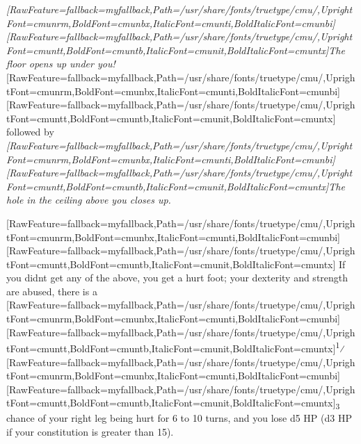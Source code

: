 \begin{myitemize}\item{}{\itshape \allowbreak{}\setmainfont{cmunti.ttf}[RawFeature={fallback=myfallback},Path=/usr/share/fonts/truetype/cmu/,UprightFont=cmunrm,BoldFont=cmunbx,ItalicFont=cmunti,BoldItalicFont=cmunbi]\setmonofont{cmunti.ttf}[RawFeature={fallback=myfallback},Path=/usr/share/fonts/truetype/cmu/,UprightFont=cmuntt,BoldFont=cmuntb,ItalicFont=cmunit,BoldItalicFont=cmuntx]\itshape {}The floor opens up under you!}{$\text{ }$}\allowbreak{}\setmainfont{cmunrm.ttf}[RawFeature={fallback=myfallback},Path=/usr/share/fonts/truetype/cmu/,UprightFont=cmunrm,BoldFont=cmunbx,ItalicFont=cmunti,BoldItalicFont=cmunbi]\setmonofont{cmunrm.ttf}[RawFeature={fallback=myfallback},Path=/usr/share/fonts/truetype/cmu/,UprightFont=cmuntt,BoldFont=cmuntb,ItalicFont=cmunit,BoldItalicFont=cmuntx] followed by {\itshape \allowbreak{}\setmainfont{cmunti.ttf}[RawFeature={fallback=myfallback},Path=/usr/share/fonts/truetype/cmu/,UprightFont=cmunrm,BoldFont=cmunbx,ItalicFont=cmunti,BoldItalicFont=cmunbi]\setmonofont{cmunti.ttf}[RawFeature={fallback=myfallback},Path=/usr/share/fonts/truetype/cmu/,UprightFont=cmuntt,BoldFont=cmuntb,ItalicFont=cmunit,BoldItalicFont=cmuntx]\itshape {}The hole in the ceiling above you closes up.}
\end{myitemize}
\allowbreak{}\setmainfont{cmunrm.ttf}[RawFeature={fallback=myfallback},Path=/usr/share/fonts/truetype/cmu/,UprightFont=cmunrm,BoldFont=cmunbx,ItalicFont=cmunti,BoldItalicFont=cmunbi]\setmonofont{cmunrm.ttf}[RawFeature={fallback=myfallback},Path=/usr/share/fonts/truetype/cmu/,UprightFont=cmuntt,BoldFont=cmuntb,ItalicFont=cmunit,BoldItalicFont=cmuntx]
If you didn\textquotesingle{}t get any of the above, you get a hurt foot; your dexterity and strength\footnotemark[95] are abused, there is a \allowbreak{}\setmainfont{cmunrm.ttf}[RawFeature={fallback=myfallback},Path=/usr/share/fonts/truetype/cmu/,UprightFont=cmunrm,BoldFont=cmunbx,ItalicFont=cmunti,BoldItalicFont=cmunbi]\setmonofont{cmunrm.ttf}[RawFeature={fallback=myfallback},Path=/usr/share/fonts/truetype/cmu/,UprightFont=cmuntt,BoldFont=cmuntb,ItalicFont=cmunit,BoldItalicFont=cmuntx]\textsuperscript{1}⁄\allowbreak{}\setmainfont{cmunrm.ttf}[RawFeature={fallback=myfallback},Path=/usr/share/fonts/truetype/cmu/,UprightFont=cmunrm,BoldFont=cmunbx,ItalicFont=cmunti,BoldItalicFont=cmunbi]\setmonofont{cmunrm.ttf}[RawFeature={fallback=myfallback},Path=/usr/share/fonts/truetype/cmu/,UprightFont=cmuntt,BoldFont=cmuntb,ItalicFont=cmunit,BoldItalicFont=cmuntx]\textsubscript{3} chance of your right leg being hurt\footnotemark[96] for 6 to 10 turns, and you lose d5 HP (d3 HP if your constitution\footnotemark[97] is greater than 15).




